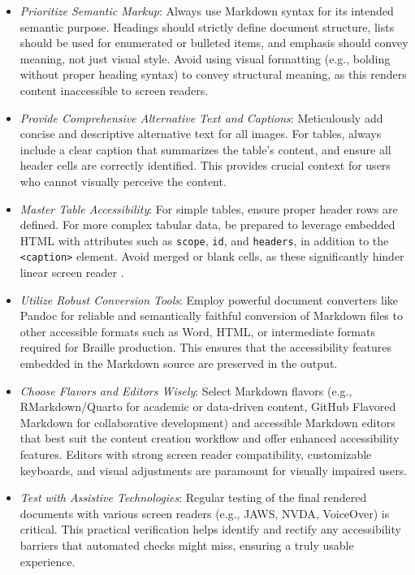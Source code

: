 \begin{itemize}
	\item \emph{Prioritize Semantic Markup}: Always use Markdown syntax for its intended semantic purpose. Headings should strictly define document structure, lists should be used for enumerated or bulleted items, and emphasis should convey meaning, not just visual style. Avoid using visual formatting (e.g., bolding without proper heading syntax) to convey structural meaning, as this renders content inaccessible to screen readers.
	\item \emph{Provide Comprehensive Alternative Text and Captions}: Meticulously add concise and descriptive alternative text for all images. For tables, always include a clear caption that summarizes the table's content, and ensure all header cells are correctly identified. This provides crucial context for users who cannot visually perceive the content.
	\item \emph{Master Table Accessibility}: For simple tables, ensure proper header rows are defined. For more complex tabular data, be prepared to leverage embedded HTML with attributes such as \texttt{scope}, \texttt{id}, and \texttt{headers}, in addition to the \texttt{<caption>} element. Avoid merged or blank cells, as these significantly hinder linear screen reader .
	\item \emph{Utilize Robust Conversion Tools}: Employ powerful document converters like Pandoc for reliable and semantically faithful conversion of Markdown files to other accessible formats such as Word, HTML, or intermediate formats required for Braille production. This ensures that the accessibility features embedded in the Markdown source are preserved in the output.
	\item \emph{Choose Flavors and Editors Wisely}: Select Markdown flavors (e.g., RMarkdown/Quarto for academic or data-driven content, GitHub Flavored Markdown for collaborative development) and accessible Markdown editors that best suit the content creation workflow and offer enhanced accessibility features. Editors with strong screen reader compatibility, customizable keyboards, and visual adjustments are paramount for visually impaired users.
	\item \emph{Test with Assistive Technologies}: Regular testing of the final rendered documents with various screen readers (e.g., JAWS, NVDA, VoiceOver) is critical. This practical verification helps identify and rectify any accessibility barriers that automated checks might miss, ensuring a truly usable experience.

\end{itemize}
